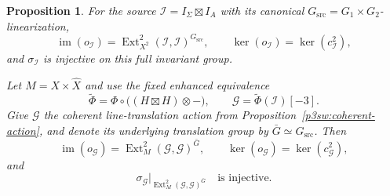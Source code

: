 \documentclass[11pt]{article}
\newtheorem{proposition}[theorem]{Proposition}
\numberwithin{equation}{section}
\begin{document}
\begin{proposition}\label{p3sw:invariant-injectivity}
For the source \(\mathcal I=I_\Sigma\boxtimes I_A\) with its canonical
\(G_{\mathrm{src}}=G_1\times G_2\)-linearization,
\begin{equation}\label{p3sw:invariant-source-conclusion}
 \operatorname{im}(o_{\mathcal I})
   =\operatorname{Ext}^2_{X^2}(\mathcal I,\mathcal I)^{G_{\mathrm{src}}},
 \qquad
 \ker(o_{\mathcal I})=\ker(c_{\mathcal I}^2),
\end{equation}
and \(\sigma_{\mathcal I}\) is injective on this full invariant group.

Let \(M=X\times\widehat X\) and use the fixed enhanced equivalence
\[
 \widetilde\Phi=\Phi\circ\bigl((H\boxtimes H)\otimes-\bigr),
 \qquad
 \mathcal G=\widetilde\Phi(\mathcal I)[-3].
\]
Give \(\mathcal G\) the coherent line-translation action from
Proposition~\ref{p3sw:coherent-action}, and denote its underlying
translation group by \(\bar G\simeq G_{\mathrm{src}}\).  Then
\begin{equation}\label{p3sw:invariant-target-conclusion}
 \operatorname{im}(o_{\mathcal G})
   =\operatorname{Ext}^2_M(\mathcal G,\mathcal G)^{\bar G},
 \qquad
 \ker(o_{\mathcal G})=\ker(c_{\mathcal G}^2),
\end{equation}
and
\[
 \sigma_{\mathcal G}\big|_{
       \operatorname{Ext}^2_M(\mathcal G,\mathcal G)^{\bar G}}
 \quad\text{is injective}.
\]
\end{proposition}
\end{document}
